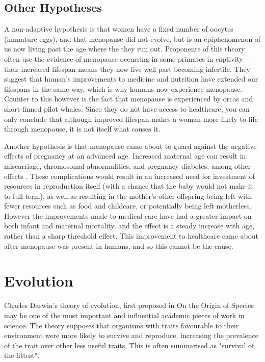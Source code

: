 \documentclass[authoryearcitations]{UoYCSproject}
\begin{document}
\subsection{Other Hypotheses}
A non-adaptive hypothesis is that women have a fixed number of oocytes (immature eggs), and that menopause did not evolve, but is an epiphenomenon of us now living past the age where the they run out. \cite{van2003ovarian, cooper1998age} Proponents of this theory often use the evidence of menopause occurring in some primates in captivity -- their increased lifespan means they now live well past becoming infertile. They suggest that human's improvements to medicine and nutrition have extended our lifespans in the same way, which is why humans now experience menopause. Counter to this however is the fact that menopause is experienced by orcas and short-finned pilot whales. Since they do not have access to healthcare, you can only conclude that although improved lifespan makes a woman more likely to life through menopause, it is not itself what causes it.

Another hypothesis is that menopause came about to guard against the negative effects of pregnancy at an advanced age. Increased maternal age can result in: miscarriage, chromosomal abnormalities, and pregnancy diabetes, among other effects \cite{cleary2005impact}. These complications would result in an increased need for investment of resources in reproduction itself (with a chance that the baby would not make it to full term), as well as resulting in the mother's other offspring being left with fewer resources such as food and childcare, or potentially being left motherless. However the improvements made to medical care have had a greater impact on both infant and maternal mortality, and the effect is a steady increase with age, rather than a sharp threshold effect. This improvement to healthcare came about after menopause was present in humans, and so this cannot be the cause.

\section{Evolution}
Charles Darwin's theory of evolution, first proposed in On the Origin of Species \cite{origin1859} may be one of the most important and influential academic pieces of work in science. The theory supposes that organisms with traits favourable to their environment were more likely to survive and reproduce, increasing the prevalence of the trait over other less useful traits. This is often summarised as "survival of the fittest".
\end{document}

